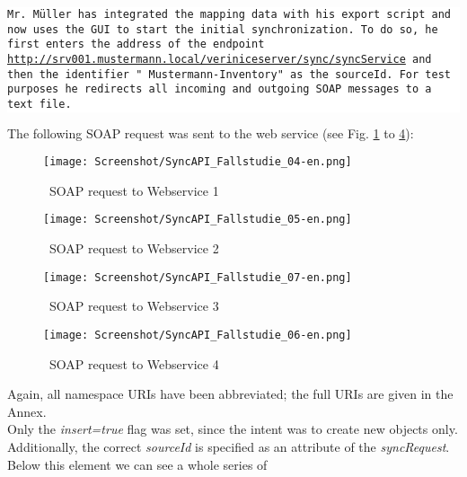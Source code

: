 \documentclass[a4paper,10pt]{book}
\begin{document}
\newline
\colorbox{white}{\parbox{\textwidth}{
{\tt Mr. Müller has integrated the mapping data with his export script and now uses the GUI to start the initial synchronization.
To do so, he first enters the address of the endpoint
\newline
\href{http://srv001.mustermann.local/veriniceserver/sync/syncService}{http://srv001.mustermann.local/veriniceserver/sync/syncService}
\newline
and then the identifier " Mustermann-Inventory" as the sourceId. For test purposes he redirects all incoming and outgoing SOAP messages to a text file.}
}}
\newline\newline
The following SOAP request was sent to the web service (see Fig. \ref{SOAP request to Webservice 1} to \ref{SOAP request to Webservice 4}):
\newline
\begin{figure}[htb!]
  \centering
  \texttt{[image: Screenshot/SyncAPI\_Fallstudie\_04-en.png]}
  \caption{\label{SOAP request to Webservice 1} \ SOAP request to Webservice 1}
\end{figure}
\newline
\begin{figure}[htb!]
  \centering
  \texttt{[image: Screenshot/SyncAPI\_Fallstudie\_05-en.png]}
  \caption{\label{SOAP request to Webservice 2} \ SOAP request to Webservice 2}
\end{figure}
\newline
\begin{figure}[htb!]
  \centering
  \texttt{[image: Screenshot/SyncAPI\_Fallstudie\_07-en.png]}
  \caption{\label{SOAP request to Webservice 3} \ SOAP request to Webservice 3}
\end{figure}
\newline
\begin{figure}[htb!]
  \centering
  \texttt{[image: Screenshot/SyncAPI\_Fallstudie\_06-en.png]}
  \caption{\label{SOAP request to Webservice 4} \ SOAP request to Webservice 4}
\end{figure}
\newline
Again, all namespace URIs have been abbreviated; the full URIs are given in the Annex.
\newline\\
Only the \textit{insert=true} flag was set, since the intent was to create new objects only. Additionally, the correct
\textit{sourceId} is specified as an attribute of the \textit{syncRequest}. Below this element we can see a whole series of
\end{document}
